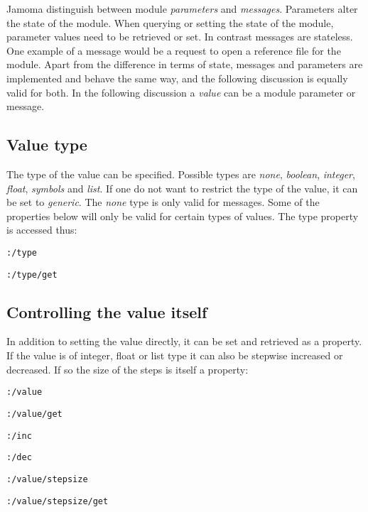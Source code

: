 \documentclass{sig-alternate}
\begin{document}
Jamoma distinguish between module \emph{parameters} and \emph{messages}. Parameters alter the state of the module. When querying or setting the state of the module, parameter values need to be retrieved or set. In contrast messages are stateless. One example of a message would be a request to open a reference file for the module. Apart from the difference in terms of state, messages and parameters are implemented and behave the same way, and the following discussion is equally valid for both. In the following discussion a \emph{value} can be a module parameter or message.




\subsection{Value type} %
\label{sub:type}

The type of the value can be specified. Possible types are \emph{none}, \emph{boolean}, \emph{integer}, \emph{float}, \emph{symbols} and \emph{list}. If one do not want to restrict the type of the value, it can be set to \emph{generic}. The \emph{none} type is only valid for messages. Some of the properties below will only be valid for certain types of values. The type property is accessed thus:

\texttt{:/type}

\texttt{:/type/get}





\subsection{Controlling the value itself} %
\label{sub:controlling_the_value_itself}

In addition to setting the value directly, it can be set and retrieved as a property. If the value is of integer, float or list type it can also be stepwise increased or decreased. If so the size of the steps is itself a property:

\texttt{:/value}

\texttt{:/value/get}

\texttt{:/inc}

\texttt{:/dec} 

\texttt{:/value/stepsize}

\texttt{:/value/stepsize/get}
\end{document}
